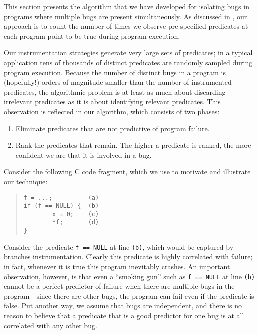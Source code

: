 This section presents the algorithm that we have developed for
isolating bugs in programs where multiple bugs are present
simultaneously.  As discussed in , our
approach is to count the number of times we observe pre-specified
predicates at each program point to be true during program
execution.

Our instrumentation strategies generate very large sets
of predicates; in a typical application tens of thousands of distinct
predicates are randomly sampled during program execution.  Because the
number of distinct bugs in a program is (hopefully!) orders of
magnitude smaller than the number of instrumented predicates, the
algorithmic problem is at least as much about discarding irrelevant
predicates as it is about identifying relevant predicates.  This
observation is reflected in our algorithm, which consists of two phases:
\begin{enumerate}
\item Eliminate predicates that are not predictive of program failure.

\item Rank the predicates that remain.  The higher a predicate is ranked,
the more confident we are that it is involved in a bug.
\end{enumerate}

Consider the following C code fragment, which we use to motivate and illustrate
our technique:
\begin{quote}
\begin{verbatim}
f = ...;          (a)
if (f == NULL) {  (b)
        x = 0;    (c)
        *f;       (d)
}
\end{verbatim}
\end{quote}
Consider the predicate {\tt f == NULL} at line {\tt (b)}, which would
be captured by branches instrumentation.  Clearly
this predicate is highly correlated with failure; in fact, whenever it
is true this program inevitably crashes.  An important observation,
however, is that even a ``smoking gun'' such as {\tt f == NULL} at
line {\tt (b)} cannot be a perfect predictor of failure when there are
multiple bugs in the program---since there are other bugs, the program can fail
even if the predicate is false.  Put another way, we assume
that bugs are independent, and there is no reason to believe that
a predicate that is a good predictor for one bug is at all correlated
with any other bug.

